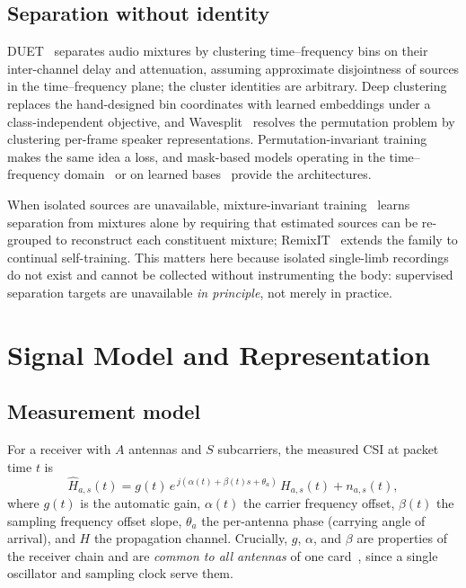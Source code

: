 \documentclass[conference]{IEEEtran}
\begin{document}
\subsection{Separation without identity}

DUET~\cite{yilmaz2004duet} separates audio mixtures by clustering
time--frequency bins on their inter-channel delay and attenuation, assuming
approximate disjointness of sources in the time--frequency plane; the cluster
identities are arbitrary. Deep clustering~\cite{hershey2016deep} replaces the
hand-designed bin coordinates with learned embeddings under a
class-independent objective, and Wavesplit~\cite{zeghidour2021wavesplit}
resolves the permutation problem by clustering per-frame speaker
representations. Permutation-invariant training~\cite{yu2017pit} makes the same
idea a loss, and mask-based models operating in the time--frequency
domain~\cite{wang2023tfgridnet} or on learned
bases~\cite{luo2019convtasnet} provide the architectures.

When isolated sources are unavailable, mixture-invariant
training~\cite{wisdom2020mixit} learns separation from mixtures alone by
requiring that estimated sources can be re-grouped to reconstruct each
constituent mixture; RemixIT~\cite{tzinis2022remixit} extends the family to
continual self-training. This matters here because isolated single-limb
recordings do not exist and cannot be collected without instrumenting the body:
supervised separation targets are unavailable \emph{in principle}, not merely
in practice.

\section{Signal Model and Representation}
\label{sec:model}

\subsection{Measurement model}

For a receiver with $A$ antennas and $S$ subcarriers, the measured CSI at
packet time $t$ is
\begin{equation}
\hat{H}_{a,s}(t) = g(t)\, e^{\,j(\alpha(t) + \beta(t)s + \theta_a)}
\, H_{a,s}(t) + n_{a,s}(t),
\label{eq:measmodel}
\end{equation}
where $g(t)$ is the automatic gain, $\alpha(t)$ the carrier frequency offset,
$\beta(t)$ the sampling frequency offset slope, $\theta_a$ the per-antenna
phase (carrying angle of arrival), and $H$ the propagation channel. Crucially,
$g$, $\alpha$, and $\beta$ are properties of the receiver chain and are
\emph{common to all antennas} of one card~\cite{halperin2011tool}, since a
single oscillator and sampling clock serve them.
\end{document}

